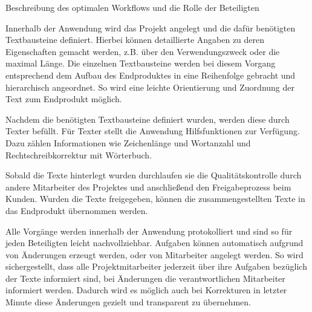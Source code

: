 Beschreibung des optimalen Workflows und die Rolle der Beteiligten

Innerhalb der Anwendung wird das Projekt angelegt und die dafür benötigten Textbausteine definiert. Hierbei können detaillierte Angaben zu deren Eigenschaften gemacht werden, z.B. über den Verwendungszweck oder die maximal Länge. Die einzelnen Textbausteine werden bei diesem Vorgang entsprechend dem Aufbau des Endproduktes in eine Reihenfolge gebracht und hierarchisch angeordnet. So wird eine leichte Orientierung und Zuordnung der Text zum Endprodukt möglich. 

Nachdem die benötigten Textbausteine definiert wurden, werden diese durch Texter befüllt. Für Texter stellt die Anwendung Hilfsfunktionen zur Verfügung. Dazu zählen Informationen wie Zeichenlänge und Wortanzahl und Rechtschreibkorrektur mit Wörterbuch.

Sobald die Texte hinterlegt wurden durchlaufen sie die Qualitätskontrolle durch andere Mitarbeiter des Projektes und anschließend den Freigabeprozess beim Kunden. Wurden die Texte freigegeben, können die zusammengestellten Texte in das Endprodukt übernommen werden. 

Alle Vorgänge werden innerhalb der Anwendung protokolliert und sind so für jeden Beteiligten leicht nachvollziehbar. Aufgaben können automatisch aufgrund von Änderungen erzeugt werden, oder von Mitarbeiter angelegt werden. So wird sichergestellt, dass alle Projektmitarbeiter jederzeit über ihre Aufgaben bezüglich der Texte informiert sind, bei Änderungen die verantwortlichen Mitarbeiter informiert werden. Dadurch wird es möglich auch bei Korrekturen in letzter Minute diese Änderungen gezielt und transparent zu übernehmen.

